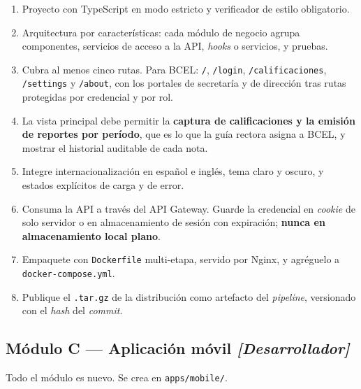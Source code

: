\documentclass[11pt,a4paper]{article}
\begin{document}
\begin{enumerate}[leftmargin=*,itemsep=3pt]
	\item Proyecto con TypeScript en modo estricto y verificador de estilo obligatorio.
	\item Arquitectura por características: cada módulo de negocio agrupa componentes, servicios de acceso a la API, \emph{hooks} o servicios, y pruebas.
	\item Cubra al menos cinco rutas. Para BCEL: \texttt{/}, \texttt{/login}, \texttt{/calificaciones}, \texttt{/settings} y \texttt{/about}, con los portales de secretaría y de dirección tras rutas protegidas por credencial y por rol.
	\item La vista principal debe permitir la \textbf{captura de calificaciones y la emisión de reportes por período}, que es lo que la guía rectora asigna a BCEL, y mostrar el historial auditable de cada nota.
	\item Integre internacionalización en español e inglés, tema claro y oscuro, y estados explícitos de carga y de error.
	\item Consuma la API a través del API Gateway. Guarde la credencial en \emph{cookie} de solo servidor o en almacenamiento de sesión con expiración; \textbf{nunca en almacenamiento local plano}.
	\item Empaquete con \texttt{Dockerfile} multi-etapa, servido por Nginx, y agréguelo a \texttt{docker-compose.yml}.
	\item Publique el \texttt{.tar.gz} de la distribución como artefacto del \emph{pipeline}, versionado con el \emph{hash} del \emph{commit}.
\end{enumerate}

\subsection{Módulo C --- Aplicación móvil \emph{[Desarrollador]}}

Todo el módulo es nuevo. Se crea en \texttt{apps/mobile/}.
\end{document}
